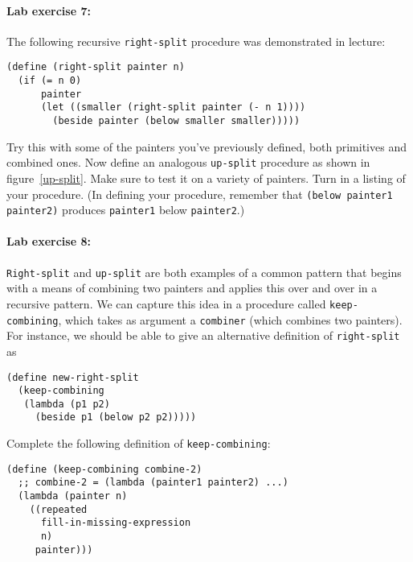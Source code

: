 \paragraph{Lab exercise 7:}
The following recursive {\tt right-split} procedure was demonstrated
in lecture:

\begin{verbatim}
(define (right-split painter n)
  (if (= n 0)
      painter
      (let ((smaller (right-split painter (- n 1))))
        (beside painter (below smaller smaller)))))
\end{verbatim}

Try this with some of the painters you've previously defined, both
primitives and combined ones.  Now define an analogous {\tt up-split}
procedure as shown in figure~\ref{up-split}.  Make sure to test it on
a variety of painters.  Turn in a listing of your procedure.  (In
defining your procedure, remember that {\tt (below painter1
painter2)} produces {\tt painter1} below {\tt painter2}.)



\paragraph{Lab exercise 8:}
{\tt Right-split} and {\tt up-split} are both examples of a common
pattern that begins with a means of combining two painters and applies
this over and over in a recursive pattern.  We can capture this idea
in a procedure called {\tt keep-combining}, which takes as argument a
{\tt combiner} (which combines two painters).  For instance, we should
be able to give an alternative definition of {\tt right-split} as

\begin{verbatim}
(define new-right-split
  (keep-combining
   (lambda (p1 p2)
     (beside p1 (below p2 p2)))))
\end{verbatim}

\noindent
Complete the following definition of {\tt keep-combining}:

\begin{verbatim}
(define (keep-combining combine-2)
  ;; combine-2 = (lambda (painter1 painter2) ...)
  (lambda (painter n)
    ((repeated
      fill-in-missing-expression
      n)
     painter)))
\end{verbatim}

